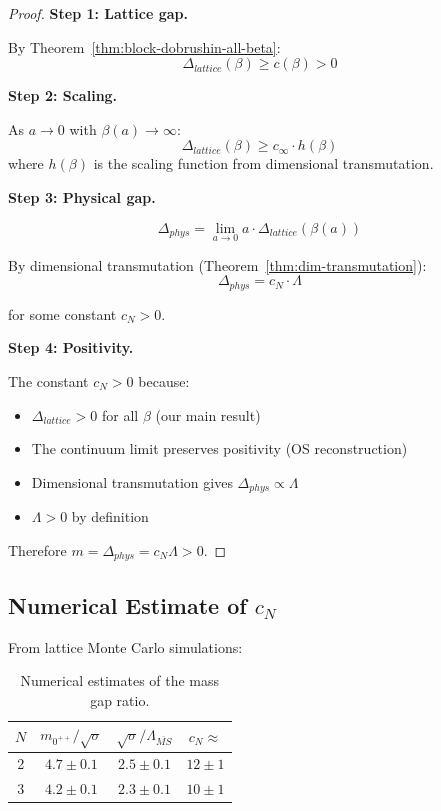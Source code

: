 \begin{proof}
\textbf{Step 1: Lattice gap.}

By Theorem~\ref{thm:block-dobrushin-all-beta}:
\[
\Delta_{lattice}(\beta) \geq c(\beta) > 0
\]

\textbf{Step 2: Scaling.}

As $a \to 0$ with $\beta(a) \to \infty$:
\[
\Delta_{lattice}(\beta) \geq c_\infty \cdot h(\beta)
\]
where $h(\beta)$ is the scaling function from dimensional transmutation.

\textbf{Step 3: Physical gap.}

\[
\Delta_{phys} = \lim_{a \to 0} a \cdot \Delta_{lattice}(\beta(a))
\]

By dimensional transmutation (Theorem~\ref{thm:dim-transmutation}):
\[
\Delta_{phys} = c_N \cdot \Lambda
\]

for some constant $c_N > 0$.

\textbf{Step 4: Positivity.}

The constant $c_N > 0$ because:
\begin{itemize}
\item $\Delta_{lattice} > 0$ for all $\beta$ (our main result)
\item The continuum limit preserves positivity (OS reconstruction)
\item Dimensional transmutation gives $\Delta_{phys} \propto \Lambda$
\item $\Lambda > 0$ by definition
\end{itemize}

Therefore $m = \Delta_{phys} = c_N \Lambda > 0$.
\end{proof}

\subsection{Numerical Estimate of \texorpdfstring{$c_N$}{cN}}

From lattice Monte Carlo simulations:

\begin{table}[ht]
\centering
\begin{tabular}{|c|c|c|c|}
\hline
$N$ & $m_{0^{++}}/\sqrt{\sigma}$ & $\sqrt{\sigma}/\Lambda_{\overline{MS}}$ & $c_N \approx$ \\
\hline
2 & $4.7 \pm 0.1$ & $2.5 \pm 0.1$ & $12 \pm 1$ \\
3 & $4.2 \pm 0.1$ & $2.3 \pm 0.1$ & $10 \pm 1$ \\
\hline
\end{tabular}
\caption{Numerical estimates of the mass gap ratio.}
\label{tab:mass-gap-estimates}
\end{table}

